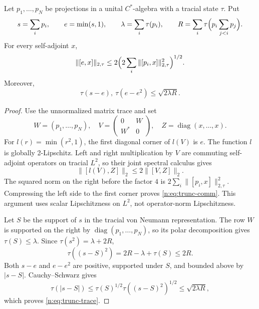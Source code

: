 \begin{lemma}\label{n:lem:truncation}
Let $p_1,\ldots,p_N$ be projections in a unital $C^*$-algebra with a
tracial state $\tau$. Put
\[
 s=\sum_ip_i,\qquad e=\min(s,1),\qquad
 \lambda=\sum_i\tau(p_i),\qquad R=\sum_i\tau\Bigl(p_i\sum_{j<i}p_j\Bigr).
\]
For every self-adjoint $x$,
\begin{equation}\label{n:eq:trunc-comm}
 \|[e,x]\|_{2,\tau}
 \le2\Bigl(2\sum_i\|[p_i,x]\|_{2,\tau}^2\Bigr)^{1/2}.
\end{equation}
Moreover,
\begin{equation}\label{n:eq:trunc-trace}
 \tau(s-e),\ \tau(e-e^2)\le\sqrt{2\lambda R}.
\end{equation}
\end{lemma}
\begin{proof}
Use the unnormalized matrix trace and set
\[
 W=(p_1,\ldots,p_N),\quad
 V=\begin{pmatrix}0&W\\W^*&0\end{pmatrix},\quad
 Z=\operatorname{diag}(x,\ldots,x).
\]
For $l(r)=\min(r^2,1)$, the first diagonal corner of $l(V)$ is $e$.
The function $l$ is globally 2-Lipschitz. Left and right multiplication
by $V$ are commuting self-adjoint operators on tracial $L^2$, so their
joint spectral calculus gives
\[
 \|[l(V),Z]\|_2\le2\|[V,Z]\|_2.
\]
The squared norm on the right before the factor $4$ is
$2\sum_i\|[p_i,x]\|_{2,\tau}^2$. Compressing the left side to the first
corner proves \eqref{n:eq:trunc-comm}. This argument uses scalar
Lipschitzness on $L^2$, not operator-norm Lipschitzness.

Let $S$ be the support of $s$ in the tracial von Neumann representation.
The row $W$ is supported on the right by
$\operatorname{diag}(p_1,\ldots,p_N)$, so its polar decomposition gives
$\tau(S)\le\lambda$. Since $\tau(s^2)=\lambda+2R$,
\[
 \tau((s-S)^2)=2R-\lambda+\tau(S)\le2R.
\]
Both $s-e$ and $e-e^2$ are positive, supported under $S$, and bounded
above by $|s-S|$. Cauchy--Schwarz gives
\[
 \tau(|s-S|)\le\tau(S)^{1/2}\tau((s-S)^2)^{1/2}
       \le\sqrt{2\lambda R},
\]
which proves \eqref{n:eq:trunc-trace}.
\end{proof}

